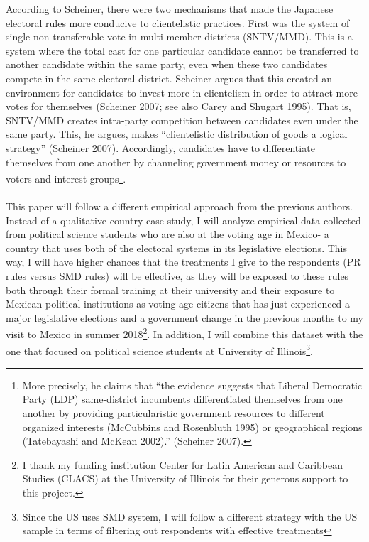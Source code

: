 \documentclass{article}
\begin{document}
According to Scheiner, there were two mechanisms that made the Japanese electoral rules more conducive to clientelistic practices. First was the system of single non-transferable vote in multi-member districts (SNTV/MMD). This is a system where the total cast for one particular candidate cannot be transferred to another candidate within the same party, even when these two candidates compete in the same electoral district. Scheiner argues that this created an environment for candidates to invest more in clientelism in order to attract more votes for themselves (Scheiner 2007; see also Carey and Shugart 1995). That is, SNTV/MMD creates intra-party competition between candidates even under the same party. This, he argues, makes ``clientelistic distribution of goods a logical strategy'' (Scheiner 2007). Accordingly, candidates have to differentiate themselves from one another by channeling government money or resources to voters and interest groups\footnote{More precisely, he claims that ``the evidence suggests that Liberal Democratic Party (LDP) same-district incumbents differentiated themselves from one another by providing particularistic government resources to different organized interests (McCubbins and Rosenbluth 1995) or geographical regions (Tatebayashi and McKean 2002).'' (Scheiner 2007).}.\\
\\
This paper will follow a different empirical approach from the previous authors. Instead of a qualitative country-case study, I will analyze empirical data collected from political science students who are also at the voting age in Mexico- a country that uses both of the electoral systems in its legislative elections. This way, I will have higher chances that the treatments I give to the respondents (PR rules versus SMD rules) will be effective, as they will be exposed to these rules both through their formal training at their university and their exposure to Mexican political institutions as voting age citizens that has just experienced a major legislative elections and a government change in the previous months to my visit to Mexico in summer 2018\footnote{I thank my funding institution Center for Latin American and Caribbean Studies (CLACS) at the University of Illinois for their generous support to this project.}. In addition, I will combine this dataset with the one that focused on political science students at University of Illinois\footnote{Since the US uses SMD system, I will follow a different strategy with the US sample in terms of filtering out respondents with effective treatments}. 
\end{document}
